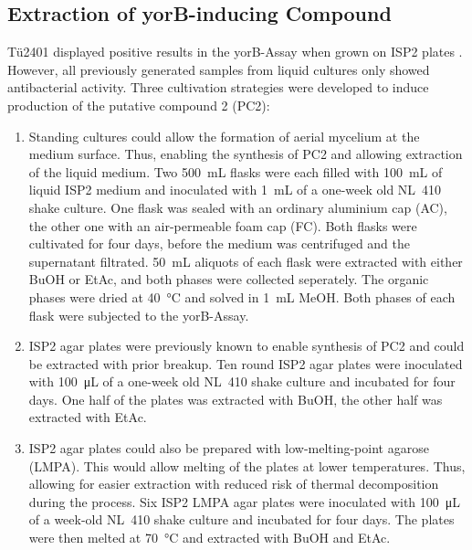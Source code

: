
    \subsection{Extraction of yorB-inducing Compound} %
    \label{sub:extraction_of_yorb_inducing_compound}

    Tü2401 displayed positive results in the yorB-Assay  when grown on ISP2 plates . However, all previously generated samples from liquid cultures only showed antibacterial activity.
    Three cultivation strategies were developed to induce production of the putative compound 2 (PC2):

    \begin{enumerate}
        \item Standing cultures could allow the formation of aerial mycelium at the medium surface. Thus, enabling the synthesis of PC2 and allowing extraction of the liquid medium. Two \SI{500}{\milli\liter} flasks were each filled with \SI{100}{\milli\liter} of liquid ISP2 medium and inoculated with \SI{1}{\milli\liter} of a one-week old NL~410 shake culture. One flask was sealed with an ordinary aluminium cap (AC), the other one with an air-permeable foam cap (FC). Both flasks were cultivated for four days, before the medium was centrifuged and the supernatant filtrated. \SI{50}{\milli\liter} aliquots of each flask were extracted with either BuOH or EtAc, and both phases were collected seperately. The organic phases were dried at \SI{40}{\celsius} and solved in \SI{1}{\milli\liter} MeOH. Both phases of each flask were subjected to the yorB-Assay.
        \item ISP2 agar plates were previously known to enable synthesis of PC2 and could be extracted with prior breakup. Ten round ISP2 agar plates were inoculated with \SI{100}{\micro\liter} of a one-week old NL~410 shake culture and incubated for four days. One half of the plates was extracted with BuOH, the other half was extracted with EtAc.
        \item ISP2 agar plates could also be prepared with low-melting-point agarose (LMPA). This would allow melting of the plates at lower temperatures. Thus, allowing for easier extraction with reduced risk of thermal decomposition during the process. Six ISP2 LMPA agar plates were inoculated with \SI{100}{\micro\liter} of a week-old NL~410 shake culture and incubated for four days. The plates were then melted at \SI{70}{\celsius} and extracted with BuOH and EtAc.
    \end{enumerate}

